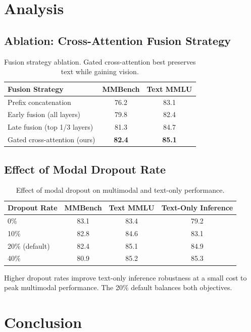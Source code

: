 \documentclass[11pt,a4paper]{article}
\begin{document}
\section{Analysis}

\subsection{Ablation: Cross-Attention Fusion Strategy}

\begin{table}[H]
\centering
\begin{tabular}{lcc}
\toprule
\textbf{Fusion Strategy} & \textbf{MMBench} & \textbf{Text MMLU} \\
\midrule
Prefix concatenation & 76.2 & 83.1 \\
Early fusion (all layers) & 79.8 & 82.4 \\
Late fusion (top 1/3 layers) & 81.3 & 84.7 \\
Gated cross-attention (ours) & \textbf{82.4} & \textbf{85.1} \\
\bottomrule
\end{tabular}
\caption{Fusion strategy ablation. Gated cross-attention best preserves text while gaining vision.}
\end{table}

\subsection{Effect of Modal Dropout Rate}

\begin{table}[H]
\centering
\begin{tabular}{lccc}
\toprule
\textbf{Dropout Rate} & \textbf{MMBench} & \textbf{Text MMLU} & \textbf{Text-Only Inference} \\
\midrule
0\% & 83.1 & 83.4 & 79.2 \\
10\% & 82.8 & 84.6 & 83.1 \\
20\% (default) & 82.4 & 85.1 & 84.9 \\
40\% & 80.9 & 85.2 & 85.3 \\
\bottomrule
\end{tabular}
\caption{Effect of modal dropout on multimodal and text-only performance.}
\end{table}

Higher dropout rates improve text-only inference robustness at a small cost to
peak multimodal performance. The 20\% default balances both objectives.

\section{Conclusion}
\end{document}
